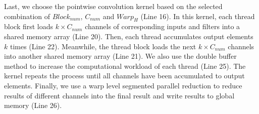 Last, we choose the pointwise convolution kernel based on the selected combination of $Block_{num}$, $C_{num}$ and $Warp_H$ (Line 16).
In this kernel, each thread block first loads $k \times C_{num}$ channels of corresponding inputs and filters into a shared memory array (Line 20).
Then, each thread accumulates output elements $k$ times (Line 22).
Meanwhile, the thread block loads the next $k \times C_{num}$ channels into another shared memory array (Line 21).
We also use the double buffer method to increase the computational workload of each thread (Line 25).
The kernel repeats the process until all channels have been accumulated to output elements.
Finally, we use a warp level segmented parallel reduction to reduce results of different channels into the final result and write results to global memory (Line 26).
